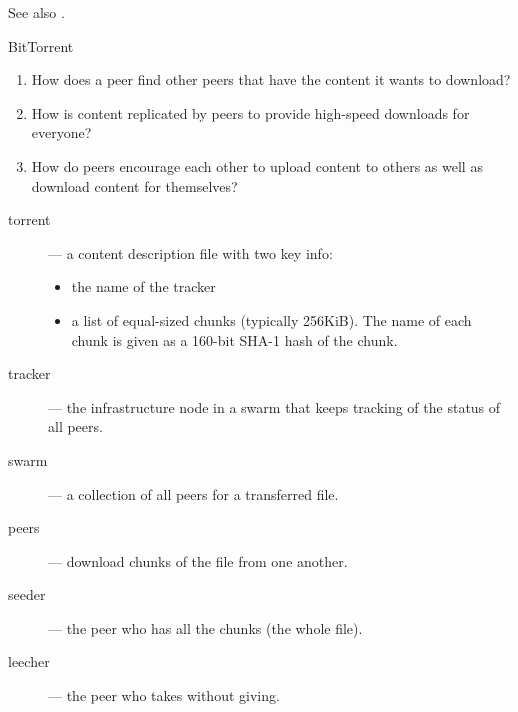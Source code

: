 See also .
  
\begin{frame}{BitTorrent}
  \centering
  \mode<beamer>{\texttt{[image: bt-ast]} }%

  {\footnotesize
    \begin{enumerate}
    \item How does a peer find other peers that have the content it wants to download?
    \item How is content replicated by peers to provide high-speed downloads for everyone?
    \item How do peers encourage each other to upload content to others as well as
      download content for themselves?
    \end{enumerate}}
\end{frame}

\begin{description}
\item[torrent] --- a content description file with two key info:
  \begin{itemize}
  \item the name of the tracker
  \item a list of equal-sized chunks (typically 256KiB). The name of each chunk is given
    as a 160-bit SHA-1 hash of the chunk.
  \end{itemize}
\item[tracker] --- the infrastructure node in a swarm that keeps tracking of the status of
  all peers.
\item[swarm] --- a collection of all peers for a transferred file.
\item[peers] --- download chunks of the file from one another.
\item[seeder] --- the peer who has all the chunks (the whole file).
\item[leecher] --- the peer who takes without giving.
\end{description}

